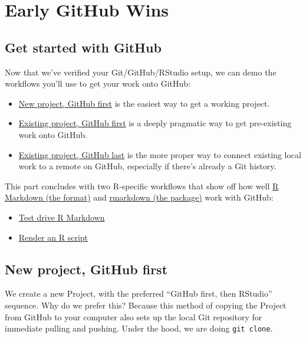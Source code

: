 \documentclass[
]{book}
\providecommand{\tightlist}{%
  \setlength{\itemsep}{0pt}\setlength{\parskip}{0pt}}
\begin{document}
\part{Early GitHub Wins}\label{part-early-github-wins}

\chapter*{Get started with GitHub}\label{usage-intro}

Now that we've verified your Git/GitHub/RStudio setup, we can demo the workflows you'll use to get your work onto GitHub:

\begin{itemize}
\tightlist
\item
  \hyperref[new-github-first]{New project, GitHub first} is the easiest way to get a working project.
\item
  \hyperref[existing-github-first]{Existing project, GitHub first} is a deeply pragmatic way to get pre-existing work onto GitHub.
\item
  \hyperref[existing-github-last]{Existing project, GitHub last} is the more proper way to connect existing local work to a remote on GitHub, especially if there's already a Git history.
\end{itemize}

This part concludes with two R-specific workflows that show off how well \href{https://rmarkdown.rstudio.com}{R Markdown (the format)} and \href{https://cran.r-project.org/package=rmarkdown}{rmarkdown (the package)} work with GitHub:

\begin{itemize}
\tightlist
\item
  \hyperref[rmd-test-drive]{Test drive R Markdown}
\item
  \hyperref[r-test-drive]{Render an R script}
\end{itemize}

\chapter{New project, GitHub first}\label{new-github-first}

We create a new Project, with the preferred ``GitHub first, then RStudio'' sequence.
Why do we prefer this?
Because this method of copying the Project from GitHub to your computer also sets up the local Git repository for immediate pulling and pushing.
Under the hood, we are doing \texttt{git\ clone}.
\end{document}
